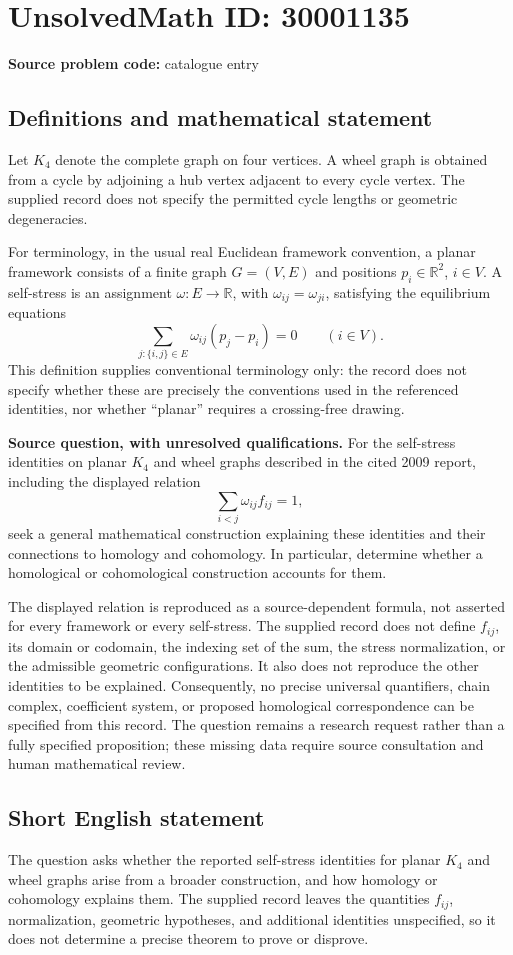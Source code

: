 \documentclass[11pt]{article}
\newcommand{\R}{\mathbb{R}}
\begin{document}
\section*{UnsolvedMath ID: 30001135}
\textbf{Source problem code:} catalogue entry
\subsection{Definitions and mathematical statement}
Let \(K_4\) denote the complete graph on four vertices. A wheel graph is obtained from a cycle by adjoining a hub vertex adjacent to every cycle vertex. The supplied record does not specify the permitted cycle lengths or geometric degeneracies.

For terminology, in the usual real Euclidean framework convention, a planar framework consists of a finite graph \(G=(V,E)\) and positions \(p_i\in\R^2\), \(i\in V\). A self-stress is an assignment \(\omega:E\to\R\), with \(\omega_{ij}=\omega_{ji}\), satisfying the equilibrium equations
\[
\sum_{j:\{i,j\}\in E}\omega_{ij}(p_j-p_i)=0
\qquad(i\in V).
\]
This definition supplies conventional terminology only: the record does not specify whether these are precisely the conventions used in the referenced identities, nor whether ``planar'' requires a crossing-free drawing.

\textbf{Source question, with unresolved qualifications.} For the self-stress identities on planar \(K_4\) and wheel graphs described in the cited 2009 report, including the displayed relation
\[
\sum_{i<j}\omega_{ij}f_{ij}=1,
\]
seek a general mathematical construction explaining these identities and their connections to homology and cohomology. In particular, determine whether a homological or cohomological construction accounts for them.

The displayed relation is reproduced as a source-dependent formula, not asserted for every framework or every self-stress. The supplied record does not define \(f_{ij}\), its domain or codomain, the indexing set of the sum, the stress normalization, or the admissible geometric configurations. It also does not reproduce the other identities to be explained. Consequently, no precise universal quantifiers, chain complex, coefficient system, or proposed homological correspondence can be specified from this record. The question remains a research request rather than a fully specified proposition; these missing data require source consultation and human mathematical review.
\subsection{Short English statement}
The question asks whether the reported self-stress identities for planar \(K_4\) and wheel graphs arise from a broader construction, and how homology or cohomology explains them. The supplied record leaves the quantities \(f_{ij}\), normalization, geometric hypotheses, and additional identities unspecified, so it does not determine a precise theorem to prove or disprove.
\end{document}
